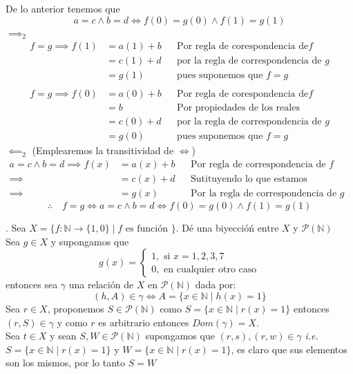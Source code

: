 \documentclass[letterpaper]{article}
\newcommand{\N}{\mathds{N}}
\renewcommand{\P}{\mathcal{P}}
\renewcommand{\*}{\cdot}
\theoremstyle{definition}
\begin{document}
De lo anterior tenemos que 
\[ a = c \land b = d \iff f(0) = g(0) \land f(1) = g(1) \]
$ \implies_2 $
\begin{align*}
	f = g \implies f (1) &= a(1) + b &&\text{Por regla de corespondencia de} f \\
	 &= c(1) + d &&\text{por la regla de correspondencia de }g \\
	 &= g(1) &&\text{pues suponemos que } f = g \\ \\
	f = g \implies f (0) &= a(0) + b &&\text{Por regla de corespondencia de} f \\
	 &= b &&\text{Por propiedades de los reales} \\
	 &= c (0) + d &&\text{por la regla de correspondencia de }g \\
	 &= g(0) &&\text{pues suponemos que } f = g 
\end{align*}
$ \impliedby_2 $ (Emplearemos la transitividad de $ \iff $)
\begin{align*}
	a = c \land b = d \implies f(x) &= a(x) + b &&\text{Por regla de correspondencia de } f\\
	\implies &= c(x) + d &&\text{Sutituyendo lo que estamos suponiendo }\\
	\implies &= g(x) &&\text{Por la regla de correspondencia de } g
\end{align*}
$$ \therefore \quad f = g \iff a = c \land b = d \iff f(0) = g(0) \land f(1) = g(1)  $$



\newpage
{}. Sea $ X = \{ f: \N \to \{1,0\} \mid f \text{ es función } \}  $. Dé una biyeccióń entre $ X $ y $ \P(\N) $\\
Sea $ g \in X $ y supongamos que $$ g (x) = \begin{cases}
1, \text{ si } x = 1,2,3,7\\
0, \text{ en cualquier otro caso}
\end{cases} $$
entonces sea $ \gamma $ una relación de $ X $ en $ \P(\N) $ dada por:
\[ (h,A) \in \gamma \iff A = \{ x \in \N \mid h(x) = 1 \}  \]
Sea $ r \in X $, proponemos $ S \in \P(\N) $ como $ S = \{ x\in  \N \mid r(x) = 1 \} $ entonces $ (r,S) \in \gamma $ y como $ r $ es arbitrario entonces $ Dom(\gamma) = X $.\\


Sea $ t \in X  $ y sean $ S, W \in \P(\N)$ supongamos que $ (r,s), (r,w) \in \gamma $ \textit{i.e. } $ S = \{ x \in \N \mid r(x) = 1 \} $ y 
$ W= \{ x \in \N \mid r(x) = 1 \} $, es claro que sus elementos son los mismos, por lo tanto $ S = W $
\end{document}
